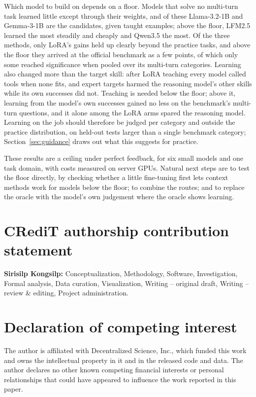 \documentclass[a4paper,fleqn]{cas-dc}
\begin{document}
Which model to build on depends on a floor. Models that solve no multi-turn task learned little except through their
weights, and of these Llama-3.2-1B and Gemma-3-1B are the candidates, given taught examples; above the floor, LFM2.5
learned the most steadily and cheaply and Qwen3.5 the most. Of the three methods, only LoRA's gains held up clearly
beyond the practice tasks, and above the floor they arrived at the official benchmark as a few points, of which only
some reached significance when pooled over its multi-turn categories. Learning also changed more than the target skill:
after LoRA teaching every model called tools when none fits, and expert targets harmed the reasoning model's other
skills while its own successes did not. Teaching is needed below the floor; above it, learning from the model's own
successes gained no less on the benchmark's multi-turn questions, and it alone among the LoRA arms spared the reasoning model. Learning on the
job should therefore be judged per category and outside the practice distribution, on held-out tests larger than a
single benchmark category; Section~\ref{sec:guidance} draws out what this suggests for practice.

These results are a ceiling under perfect feedback, for six small models and one task domain, with costs measured on
server GPUs. Natural next steps are to test the floor directly, by checking whether a little fine-tuning first lets
context methods work for models below the floor; to combine the routes; and to replace the oracle with the model's own
judgement where the oracle shows learning.

\section*{CRediT authorship contribution statement}
{\sloppy\textbf{Sirisilp Kongsilp:} Conceptualization, Methodology, Software, Investigation, Formal analysis, Data curation,
Visualization, Writing -- original draft, Writing -- review \& editing, Project administration.\par}

\section*{Declaration of competing interest}
The author is affiliated with Decentralized Science, Inc., which funded this work and owns the intellectual property in
it and in the released code and data. The author declares no other known competing financial interests or personal
relationships that could have appeared to influence the work reported in this paper.
\end{document}
